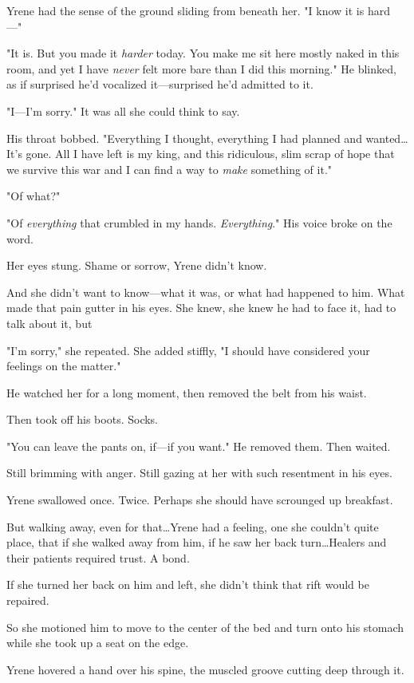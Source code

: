 Yrene had the sense of the ground sliding from beneath her.
"I know it is hard ---"

"It is.
But you made it \emph{harder} today.
You make me sit here mostly naked in this room, and yet I have \emph{never} felt more bare than I did this morning."
He blinked, as if surprised he'd vocalized it---surprised he'd admitted to it.

"I---I'm sorry."
It was all she could think to say.

His throat bobbed.
"Everything I thought, everything I had planned and wanted\ldots It's gone.
All I have left is my king, and this ridiculous, slim scrap of hope that we survive this war and I can find a way to \emph{make} something of it."

"Of what?"

"Of \emph{everything} that crumbled in my hands.
\emph{Everything}."
His voice broke on the word.

Her eyes stung.
Shame or sorrow, Yrene didn't know.

And she didn't want to know---what it was, or what had happened to him.
What made that pain gutter in his eyes.
She knew, she knew he had to face it, had to talk about it, but 

"I'm sorry," she repeated.
She added stiffly, "I should have considered your feelings on the matter."

He watched her for a long moment, then removed the belt from his waist.

Then took off his boots.
Socks.

"You can leave the pants on, if---if you want."
He removed them.
Then waited.

Still brimming with anger.
Still gazing at her with such resentment in his eyes.

Yrene swallowed once.
Twice.
Perhaps she should have scrounged up breakfast.

But walking away, even for that\ldots Yrene had a feeling, one she couldn't quite place, that if she walked away from him, if he saw her back turn\ldots Healers and their patients required trust.
A bond.

If she turned her back on him and left, she didn't think that rift would be repaired.

So she motioned him to move to the center of the bed and turn onto his stomach while she took up a seat on the edge.

Yrene hovered a hand over his spine, the muscled groove cutting deep through it.

